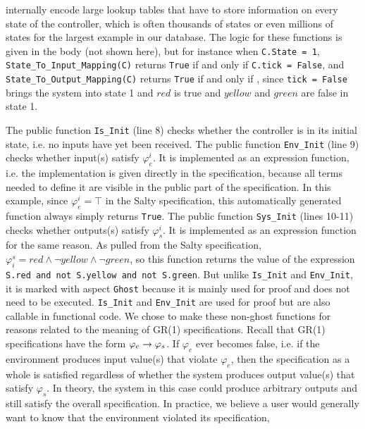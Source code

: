 \documentclass[runningheads]{llncs}
\begin{document}
internally encode large lookup tables that have to store information on every state of the controller, 
which is often thousands of states or even millions of states for the largest example in our database.
The logic for these functions is given in the body (not shown here), but for instance when \lstinline{C.State = 1}, 
\lstinline{State_To_Input_Mapping(C)} returns \lstinline{True} if and only if \lstinline{C.tick = False}, and 
\lstinline{State_To_Output_Mapping(C)} returns \lstinline{True} if and only if 
, 
since \lstinline{tick = False} brings the system into state 1 and $red$ is true and $yellow$ and $green$ are false in state 1.
 

The public function \lstinline{Is_Init} (line 8) checks whether the controller is in its initial state, i.e. no inputs have yet been received. 
The public function \lstinline{Env_Init} (line 9) checks whether input(s) satisfy $\varphi_e^i$. 
It is implemented as an expression function, i.e. the implementation is given directly in the specification, 
because all terms needed to define it are visible in the public part of the specification. 
In this example, since $\varphi_e^i = \top$ in the Salty specification, this automatically generated function always simply returns \lstinline{True}. 
The public function \lstinline{Sys_Init} (lines 10-11) checks whether outputs(s) satisfy $\varphi_s^i$. 
It is implemented as an expression function for the same reason.  
As pulled from the Salty specification, $\varphi^s_i = red \land \lnot yellow \land \lnot green$, so this function returns the value of
the expression \lstinline{S.red and not S.yellow and not S.green}.
But unlike \lstinline{Is_Init} and \lstinline{Env_Init}, it is marked with aspect \lstinline{Ghost} because it is mainly used for proof and does not need to be executed. 
\lstinline{Is_Init} and \lstinline{Env_Init} are used for proof but are also callable in functional code. 
We chose to make these non-ghost functions for reasons related to the meaning of GR(1) specifications. 
Recall that GR(1) specifications have the form $\varphi_e \rightarrow \varphi_s$. 
If $\varphi_e$ ever becomes false, i.e. if the environment produces input value(s) that violate $\varphi_e$, then the specification as a whole 
is satisfied regardless of whether the system produces output value(s) that satisfy $\varphi_s$. 
In theory, the system in this case could produce arbitrary outputs and still satisfy the overall specification. 
In practice, we believe a user would generally want to know that the environment violated its specification, 
\end{document}
